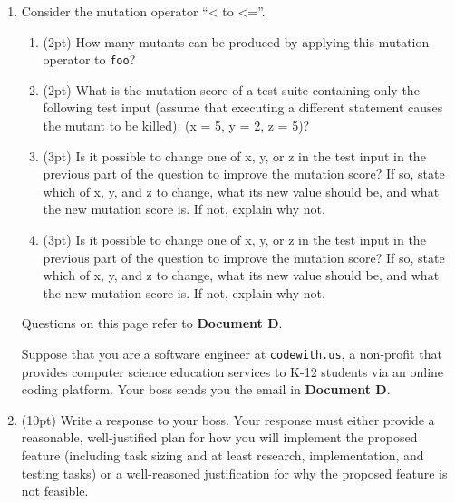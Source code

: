 \documentclass{report}
\newif\ifkey
\newcommand{\answershort}[1]{\ifkey\color{red}\underline{\textbf{#1}}\color{black}\else\underline{\hspace{3in}}\fi\xspace}
\newcommand{\answerlong}[1]{\ifkey\color{red}\textbf{#1}\color{black}\else\vspace{0.5in}\fi\xspace}
\newcommand*{\pts}[1]{\addtocounter{points}{#1}(#1pt)}
\begin{document}
\begin{spacing}{1.4}
\begin{enumerate}[leftmargin=*]
  \item \label{el1} Consider the mutation operator ``< to <=''.
    \begin{enumerate}
    \item \pts{2} How many mutants can be produced by applying this mutation operator
    to \lstinline$foo$?\\ \answershort{2}
    \item \pts{2} What is the mutation score of a test suite containing only the following test input (assume that executing a different statement causes the mutant to be killed):
    (x = 5, y = 2, z = 5)?\\ \answershort{0\%}
    \item \pts{3} Is it possible to change one of x, y, or z in the test input in the previous part of the question to improve the mutation score?
    If so, state which of x, y, and z to change, what its new value should be, and what the new mutation score is. If not, explain
    why not. \\
    \answerlong{z = 6 changes the mutation score to 50\%}
    \item \pts{3} Is it possible to change one of x, y, or z in the test input in the previous part of the question to improve the mutation score?
    If so, state which of x, y, and z to change, what its new value should be, and what the new mutation score is. If not, explain
    why not. \\
    \answerlong{It is not, because the second mutant is an equivalent mutant.}
    \end{enumerate}

    \newpage

    Questions on this page refer to \textbf{Document D}.

    Suppose that you are a software engineer at \lstinline{codewith.us}, a non-profit that provides computer science education
    services to K-12 students via an online coding platform. Your boss sends you the email in \textbf{Document D}.

  \item \pts{10} Write a response to your boss. Your response must either provide a reasonable, well-justified plan
    for how you will implement the proposed feature (including task sizing and at least research, implementation, and testing tasks)
    or a well-reasoned justification for why the proposed feature is not feasible.

    \answerlong{The proposed feature is an instance of the halting problem, and Mr. Rice's insistence that
      you get the correct answer 100\% of the time means that it is impossible to implement the feature as described.
    Correct answers must be phrased as an email, and use a polite but firm tone.}


\end{enumerate}
\end{spacing}
\end{document}

